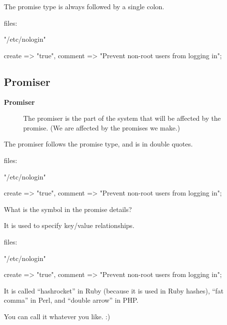 The promise type is always followed by a single colon.

\begin{code}
files:    

    "/etc/nologin" 

        create  => "true",
        comment => "Prevent non-root users from logging in";
\end{code}





\subsection{Promiser}

\begin{description}
\item[\textbf{Promiser}] The promiser is the part of the system that will be affected by the
promise. (We are affected by the promises we make.)
\end{description}





The promiser follows the promise type, and is in double quotes.

\begin{code}
files:

    "/etc/nologin"  

        create  => "true",
        comment => "Prevent non-root users from logging in";
\end{code}





What is the \kode{=\textgreater{}} symbol in the promise details?

It is used to specify key/value relationships.

\begin{code}
files:    

    "/etc/nologin" 

        create  => "true",
        comment => "Prevent non-root users from logging in";
\end{code}

It is called ``hashrocket'' in Ruby (because it is used in Ruby hashes),
``fat comma'' in Perl, and ``double arrow'' in PHP.

You can call it whatever you like. :)


